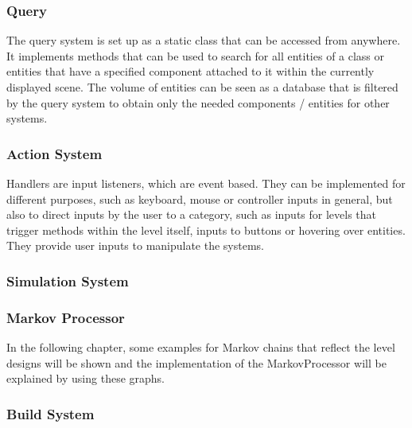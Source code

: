 \subsubsection{Query}\label{subsubsec:query2}
The query system is set up as a static class that can be accessed from anywhere.
It implements methods that can be used to search for all entities of a class or entities that have a specified component
attached to it within the currently displayed scene.
The volume of entities can be seen as a database that is filtered by the query system to obtain only the needed components / entities
for other systems. 

\subsubsection{Action System}\label{subsubsec:action-system}
Handlers are input listeners, which are event based.
They can be implemented for different purposes, such as keyboard, mouse or controller inputs in general, but also to direct inputs by the user
to a category, such as inputs for levels that trigger methods within the level itself, inputs to buttons or hovering over entities.
They provide user inputs to manipulate the systems. 
\subsubsection{Simulation System}\label{subsubsec:simulation-system}

\subsubsection{Markov Processor}\label{subsubsec:example-markov-chains}
In the following chapter, some examples for Markov chains that reflect the level designs will be shown and the implementation of the
MarkovProcessor will be explained by using these graphs.
\subsubsection{Build System}\label{subsubsec:build-system}

